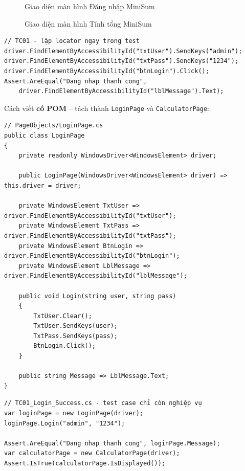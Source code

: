 \begin{figure}[H]
\centering
\caption{Giao diện màn hình Đăng nhập MiniSum}
\end{figure}


\begin{figure}[H]
\centering
\caption{Giao diện màn hình Tính tổng MiniSum}
\end{figure}


\begin{lstlisting}
// TC01 - lặp locator ngay trong test
driver.FindElementByAccessibilityId("txtUser").SendKeys("admin");
driver.FindElementByAccessibilityId("txtPass").SendKeys("1234");
driver.FindElementByAccessibilityId("btnLogin").Click();
Assert.AreEqual("Dang nhap thanh cong",
    driver.FindElementByAccessibilityId("lblMessage").Text);
\end{lstlisting}


Cách viết \textbf{có POM} – tách thành \texttt{LoginPage} và \texttt{CalculatorPage}:

\begin{lstlisting}
// PageObjects/LoginPage.cs
public class LoginPage
{
    private readonly WindowsDriver<WindowsElement> driver;

    public LoginPage(WindowsDriver<WindowsElement> driver) => this.driver = driver;

    private WindowsElement TxtUser => driver.FindElementByAccessibilityId("txtUser");
    private WindowsElement TxtPass => driver.FindElementByAccessibilityId("txtPass");
    private WindowsElement BtnLogin => driver.FindElementByAccessibilityId("btnLogin");
    private WindowsElement LblMessage => driver.FindElementByAccessibilityId("lblMessage");

    public void Login(string user, string pass)
    {
        TxtUser.Clear();
        TxtUser.SendKeys(user);
        TxtPass.SendKeys(pass);
        BtnLogin.Click();
    }

    public string Message => LblMessage.Text;
}
\end{lstlisting}


\begin{lstlisting}
// TC01_Login_Success.cs - test case chỉ còn nghiệp vụ
var loginPage = new LoginPage(driver);
loginPage.Login("admin", "1234");

Assert.AreEqual("Dang nhap thanh cong", loginPage.Message);
var calculatorPage = new CalculatorPage(driver);
Assert.IsTrue(calculatorPage.IsDisplayed());
\end{lstlisting}


